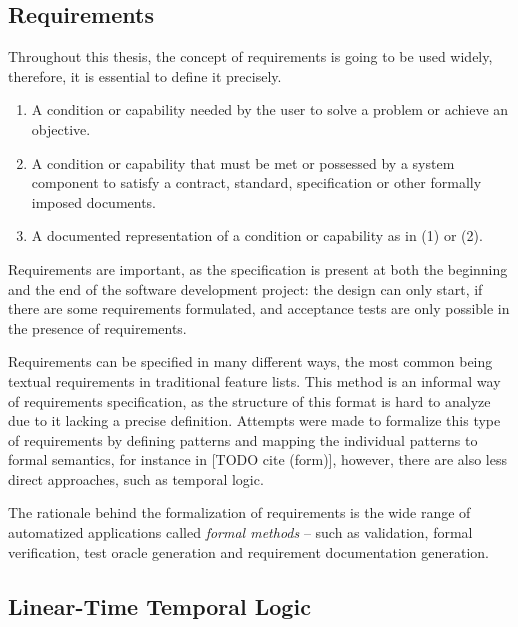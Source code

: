 \subsection{Requirements} \label{subs_backgrreq}

Throughout this thesis, the concept of requirements is going to be used widely, therefore, it is essential to define it precisely. 

\begin{definition}
	\mbox{}
	\begin{enumerate}
		\setlength\itemsep{0.1em}
		\item A condition or capability needed by the user to solve a problem or achieve an objective.
		\item A condition or capability that must be met or possessed by a system component to satisfy a contract, standard, specification or other formally imposed documents.
		\item A documented representation of a condition or capability as in (1) or (2).
	\end{enumerate}
\end{definition}

Requirements are important, as the specification is present at both the beginning and the end of the software development project: the design can only start, if there are some requirements formulated, and acceptance tests are only possible in the presence of requirements.

Requirements can be specified in many different ways, the most common being textual requirements in traditional feature lists. This method is an informal way of requirements specification, as the structure of this format is hard to analyze due to it lacking a precise definition. Attempts were made to formalize this type of requirements by defining patterns and mapping the individual patterns to formal semantics, for instance in [TODO cite (form)], however, there are also less direct approaches, such as temporal logic. 

The rationale behind the formalization of requirements is the wide range of automatized applications called \textit{formal methods} -- such as validation, formal verification, test oracle generation and requirement documentation generation.

\subsection{Linear-Time Temporal Logic} \label{subs_backgrltl}

